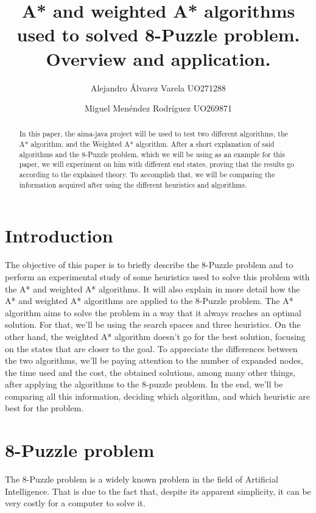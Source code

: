 \documentclass[runningheads]{llncs}
\begin{document}
\title{A* and weighted A* algorithms used to solved 8-Puzzle problem. Overview and application.}

\author{Alejandro Álvarez Varela UO271288\and
Miguel Menéndez Rodríguez UO269871}
\maketitle   
\begin{abstract}
In this paper, the aima-java project will be used to test two different algorithms, the A* algorithm, and the Weighted A* algorithm. After a short explanation of said algorithms and the 8-Puzzle problem, which we will be using as an example for this paper, we will experiment on him with different end states, proving that the results go according to the explained theory. To accomplish that, we will be comparing the information acquired after using the different heuristics and algorithms.
\end{abstract}

\section{Introduction}
The objective of this paper is to briefly describe the 8-Puzzle problem and to perform an experimental study of some heuristics used to solve this problem with the A* and weighted A* algorithms. It will also explain in more detail how the A* and weighted A* algorithms are applied to the 8-Puzzle problem.
The A* algorithm aims to solve the problem in a way that it always reaches an optimal solution. For that, we'll be using the search spaces and three heuristics.
On the other hand, the weighted A* algorithm doesn't go for the best solution, focusing on the states that are closer to the goal.
To appreciate the differences between the two algorithms, we'll be paying attention to the number of expanded nodes, the time used and the cost, the obtained solutions, among many other things, after applying the algorithms to the 8-puzzle problem.
In the end, we'll be comparing all this information, deciding which algorithm, and which heuristic are best for the problem.


\section{8-Puzzle problem}
The 8-Puzzle problem is a widely known problem in the field of Artificial Intelligence. That is due to the fact that, despite its apparent simplicity, it can be very costly for a computer to solve it.
\end{document}

